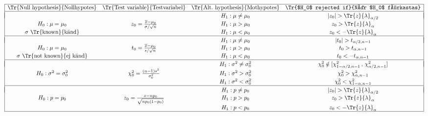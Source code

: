 \documentclass[a4paper]{article}
\begin{document}
\begin{eqnarray*}\begin{array}{|cccc|}
  \hline
   \mbox{\Tr{Null hypothesis}{Nollhypotes}} &
   \mbox{\Tr{Test variable}{Testvariabel}} &
   \mbox{\Tr{Alt.~hypothesis}{Mothypotes}}  &
   \mbox{\Tr{$H_0$ rejected if}{När $H_0$ förkastas}}
  \\ \hline &&&\\[-10pt]
  &&H_1:\mu\neq\mu_0&\vert z_0\vert>\Tr{z}{\lambda}_{\alpha/2} \\
    H_0:\mu=\mu_0
   &z_0=\frac{\overline{x}-\mu_0}{\sigma/\sqrt{n}}
   &H_1:\mu>\mu_0&z_0>\Tr{z}{\lambda}_\alpha\\
   \sigma \mbox{ \Tr{known}{känd}}
  &&H_1:\mu<\mu_0&z_0<-\Tr{z}{\lambda}_\alpha
  \\ \hline &&&\\[-10pt]
  &&H_1:\mu\neq\mu_0&\vert t_0\vert>t_{\alpha/2,n-1} \\
    H_0:\mu=\mu_0 & t_0=\frac{\overline{x}-\mu_0}{s/\sqrt{n}}
   &H_1:\mu>\mu_0 & t_0>t_{\alpha,n-1}  \\
   \sigma \mbox{ \Tr{not known}{ej känd}}
  &&H_1:\mu<\mu_0 & t_0<-t_{\alpha,n-1}
\\ \hline &&&\\[-10pt]
  &&H_1:\sigma^2\neq\sigma^2_0
    & \chi^2_0 \notin [\chi^2_{1-\alpha/2,n-1} \,,\, \chi^2_{\alpha/2,n-1}]
     \\
 H_0:\sigma^2=\sigma^2_0
    &\chi^2_0=\frac{(n-1)s^2}{\sigma^2_0}
    &H_1:\sigma^2>\sigma^2_0
    &\chi^2_0>\chi^2_{\alpha,n-1}  \\
&&H_1:\sigma^2<\sigma^2_0&\chi^2_0<\chi^2_{1-\alpha,n-1}
\\ \hline &&&\\[-10pt]
  &&H_1:p\neq p_0&\vert z_0\vert>\Tr{z}{\lambda}_{\alpha/2}\\
   H_0:p=p_0
   &z_0=\frac{x-np_0}{\sqrt{np_0(1-p_0)}}
   &H_1:p>p_0&z_0>\Tr{z}{\lambda}_\alpha \\
  &&H_1:p<p_0&z_0<-\Tr{z}{\lambda}_\alpha
\\ \hline \end{array}
\end{eqnarray*}

\subsubsection*{}%
\end{document}

